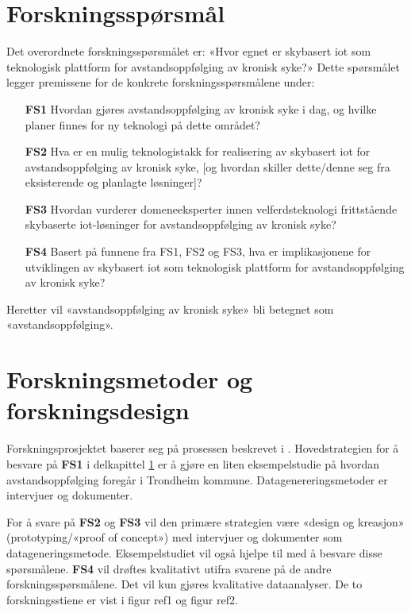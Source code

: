 \section{Forskningsspørsmål}
\label{sec:res_questions}
Det overordnete forskningsspørsmålet er: «Hvor egnet er skybasert \acrfull{iot} som teknologisk plattform for avstandsoppfølging av kronisk syke?»
Dette spørsmålet legger premissene for de konkrete forskningsspørsmålene under:

\begin{enumerate}
  \item[\textbf{FS1}] Hvordan gjøres avstandsoppfølging av kronisk syke i dag, og hvilke planer finnes for ny teknologi på dette området?
  \item[\textbf{FS2}] Hva er en mulig teknologistakk for realisering av skybasert \gls{iot} for avstandsoppfølging av kronisk syke,
    [og hvordan skiller dette/denne seg fra eksisterende og planlagte løsninger]?
  \item[\textbf{FS3}] Hvordan vurderer domeneeksperter innen velferdsteknologi frittstående skybaserte \gls{iot}-løsninger for avstandsoppfølging av kronisk syke?
  \item[\textbf{FS4}] Basert på funnene fra FS1, FS2 og FS3, hva er implikasjonene for utviklingen av skybasert \gls{iot} som teknologisk plattform
    for avstandsoppfølging av kronisk syke?
\end{enumerate}

Heretter vil «avstandsoppfølging av kronisk syke» bli betegnet som «avstandsoppfølging».

\section{Forskningsmetoder og forskningsdesign}
Forskningsprosjektet baserer seg på prosessen beskrevet i \citet{oates}. Hovedstrategien for å besvare på \textbf{FS1} i
delkapittel \ref{sec:res_questions} er å gjøre en liten eksempelstudie på hvordan avstandsoppfølging foregår i Trondheim kommune. Datagenereringsmetoder
er intervjuer og dokumenter. 

For å svare på \textbf{FS2} og \textbf{FS3} vil den primære strategien være «design og kreasjon» (prototyping/«proof of concept»)
med intervjuer og dokumenter som datageneringsmetode. Eksempelstudiet vil også hjelpe til med å besvare disse spørsmålene. \textbf{FS4} vil drøftes kvalitativt 
utifra svarene på de andre forskningsspørsmålene. Det vil kun gjøres kvalitative dataanalyser. De to forskningsstiene er vist i figur ref1 og figur ref2.

